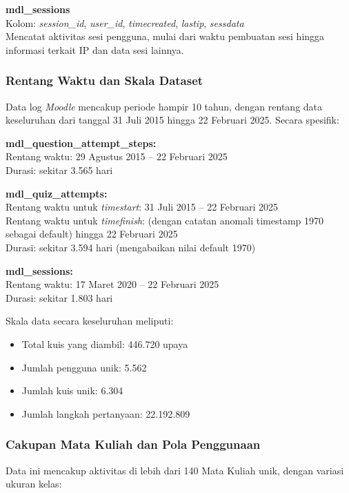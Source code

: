 \textbf{mdl\_sessions} \\
Kolom: \textit{session\_id}, \textit{user\_id}, \textit{timecreated}, \textit{lastip}, \textit{sessdata} \\
Mencatat aktivitas sesi pengguna, mulai dari waktu pembuatan sesi hingga informasi terkait IP dan data sesi lainnya.

\subsubsection{Rentang Waktu dan Skala Dataset}
\label{sec:rentangWaktuSkalaDataset}
Data log \textit{Moodle} mencakup periode hampir 10 tahun, dengan rentang data keseluruhan dari tanggal 31 Juli 2015 hingga 22 Februari 2025. Secara spesifik:

\textbf{mdl\_question\_attempt\_steps:} \\
Rentang waktu: 29 Agustus 2015 – 22 Februari 2025 \\
Durasi: sekitar 3.565 hari

\textbf{mdl\_quiz\_attempts:} \\
Rentang waktu untuk \textit{timestart}: 31 Juli 2015 – 22 Februari 2025 \\
Rentang waktu untuk \textit{timefinish}: (dengan catatan anomali timestamp 1970 sebagai default) hingga 22 Februari 2025 \\
Durasi: sekitar 3.594 hari (mengabaikan nilai default 1970)

\textbf{mdl\_sessions:} \\
Rentang waktu: 17 Maret 2020 – 22 Februari 2025 \\
Durasi: sekitar 1.803 hari

Skala data secara keseluruhan meliputi:
\begin{itemize}
    \item Total kuis yang diambil: 446.720 upaya
    \item Jumlah pengguna unik: 5.562
    \item Jumlah kuis unik: 6.304
    \item Jumlah langkah pertanyaan: 22.192.809
\end{itemize}

\subsubsection{Cakupan Mata Kuliah dan Pola Penggunaan}
\label{sec:cakupanMataKuliahPolaPenggunaan}
Data ini mencakup aktivitas di lebih dari 140 Mata Kuliah unik, dengan variasi ukuran kelas:

